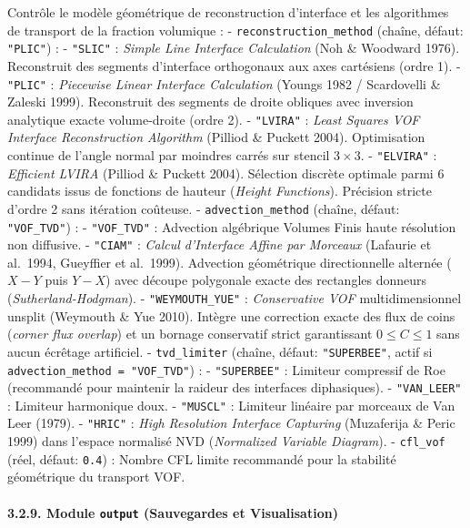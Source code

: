 \documentclass[
  french,
]{article}
\begin{document}
Contrôle le modèle géométrique de reconstruction d'interface et les
algorithmes de transport de la fraction volumique : -
\texttt{reconstruction\_method} (chaîne, défaut: \texttt{"PLIC"}) : -
\texttt{"SLIC"} : \emph{Simple Line Interface Calculation} (Noh \&
Woodward 1976). Reconstruit des segments d'interface orthogonaux aux
axes cartésiens (ordre 1). - \texttt{"PLIC"} : \emph{Piecewise Linear
Interface Calculation} (Youngs 1982 / Scardovelli \& Zaleski 1999).
Reconstruit des segments de droite obliques avec inversion analytique
exacte volume-droite (ordre 2). - \texttt{"LVIRA"} : \emph{Least Squares
VOF Interface Reconstruction Algorithm} (Pilliod \& Puckett 2004).
Optimisation continue de l'angle normal par moindres carrés sur stencil
\(3 \times 3\). - \texttt{"ELVIRA"} : \emph{Efficient LVIRA} (Pilliod \&
Puckett 2004). Sélection discrète optimale parmi 6 candidats issus de
fonctions de hauteur (\emph{Height Functions}). Précision stricte
d'ordre 2 sans itération coûteuse. - \texttt{advection\_method} (chaîne,
défaut: \texttt{"VOF\_TVD"}) : - \texttt{"VOF\_TVD"} : Advection
algébrique Volumes Finis haute résolution non diffusive. -
\texttt{"CIAM"} : \emph{Calcul d'Interface Affine par Morceaux}
(Lafaurie et al.~1994, Gueyffier et al.~1999). Advection géométrique
directionnelle alternée (\(X-Y\) puis \(Y-X\)) avec découpe polygonale
exacte des rectangles donneurs (\emph{Sutherland-Hodgman}). -
\texttt{"WEYMOUTH\_YUE"} : \emph{Conservative VOF} multidimensionnel
unsplit (Weymouth \& Yue 2010). Intègre une correction exacte des flux
de coins (\emph{corner flux overlap}) et un bornage conservatif strict
garantissant \(0 \le C \le 1\) sans aucun écrêtage artificiel. -
\texttt{tvd\_limiter} (chaîne, défaut: \texttt{"SUPERBEE"}, actif si
\texttt{advection\_method\ =\ "VOF\_TVD"}) : - \texttt{"SUPERBEE"} :
Limiteur compressif de Roe (recommandé pour maintenir la raideur des
interfaces diphasiques). - \texttt{"VAN\_LEER"} : Limiteur harmonique
doux. - \texttt{"MUSCL"} : Limiteur linéaire par morceaux de Van Leer
(1979). - \texttt{"HRIC"} : \emph{High Resolution Interface Capturing}
(Muzaferija \& Peric 1999) dans l'espace normalisé NVD (\emph{Normalized
Variable Diagram}). - \texttt{cfl\_vof} (réel, défaut: \texttt{0.4}) :
Nombre CFL limite recommandé pour la stabilité géométrique du transport
VOF.

\paragraph{\texorpdfstring{3.2.9. Module \texttt{output} (Sauvegardes et
Visualisation)}{3.2.9. Module output (Sauvegardes et Visualisation)}}\label{module-output-sauvegardes-et-visualisation}
\end{document}
